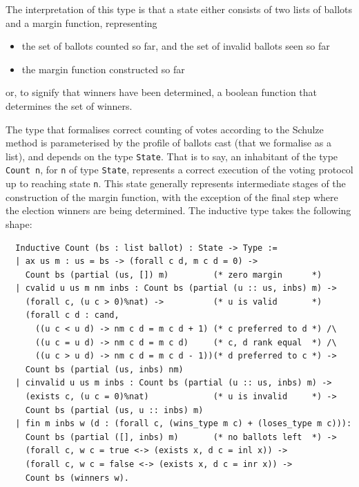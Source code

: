 \noindent
The interpretation of this type is that a state either consists of
two lists of ballots and a margin function, representing

\begin{itemize}
  \item the set of ballots counted so far, and the set of invalid
ballots seen so far
  \item the margin function constructed so far
\end{itemize}
or, to signify that winners have been determined, a boolean function
that determines the set of winners.

The type that formalises correct counting of votes according to the
Schulze method is parameterised by the profile of ballots cast (that
we formalise as a list), and depends on the type \texttt{State}. That
is to say, an inhabitant of the type \texttt{Count n}, for
\texttt{n} of type \texttt{State}, represents a correct execution of
the voting protocol up to reaching state \texttt{n}. This
state generally represents intermediate stages of the construction
of the margin function, with the exception of the final step where
the election winners are being determined. The inductive type takes
the following shape:

\begin{verbatim}
  Inductive Count (bs : list ballot) : State -> Type :=
  | ax us m : us = bs -> (forall c d, m c d = 0) -> 
    Count bs (partial (us, []) m)         (* zero margin      *)
  | cvalid u us m nm inbs : Count bs (partial (u :: us, inbs) m) -> 
    (forall c, (u c > 0)%nat) ->          (* u is valid       *)
    (forall c d : cand, 
      ((u c < u d) -> nm c d = m c d + 1) (* c preferred to d *) /\
      ((u c = u d) -> nm c d = m c d)     (* c, d rank equal  *) /\
      ((u c > u d) -> nm c d = m c d - 1))(* d preferred to c *) ->
    Count bs (partial (us, inbs) nm)
  | cinvalid u us m inbs : Count bs (partial (u :: us, inbs) m) -> 
    (exists c, (u c = 0)%nat)             (* u is invalid     *) ->
    Count bs (partial (us, u :: inbs) m)
  | fin m inbs w (d : (forall c, (wins_type m c) + (loses_type m c))):
    Count bs (partial ([], inbs) m)       (* no ballots left  *) ->
    (forall c, w c = true <-> (exists x, d c = inl x)) ->
    (forall c, w c = false <-> (exists x, d c = inr x)) ->
    Count bs (winners w).
\end{verbatim}


